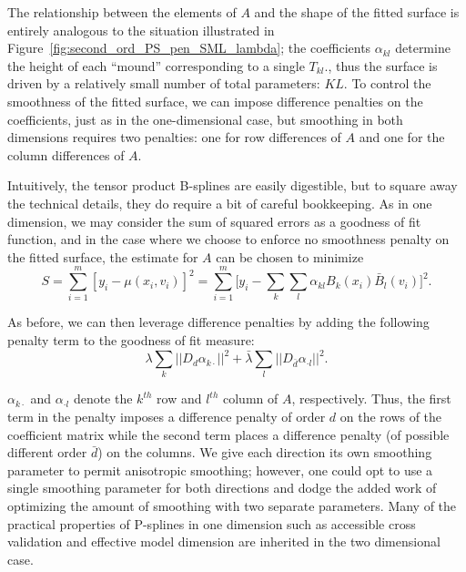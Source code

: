 \documentclass[12pt]{article}
\theoremstyle{definition}
\begin{document}
The relationship between the elements of $A$ and the shape of the fitted surface is entirely analogous to the situation illustrated in Figure~\ref{fig:second_ord_PS_pen_SML_lambda}; the coefficients $\alpha_{kl}$ determine the height of each ``mound'' corresponding to a single $T_{kl}$., thus the surface is driven by a relatively small number of total parameters: $KL$. To control the smoothness of the fitted surface, we can impose difference penalties on the coefficients, just as in the one-dimensional case, but smoothing in both dimensions requires two penalties: one for row differences of $A$ and one for the column differences of $A$.

Intuitively, the tensor product B-splines are easily digestible, but to square away the technical details, they do require a bit of careful bookkeeping. As in one dimension, we may consider the sum of squared errors as a goodness of fit function, and in the case where we choose to enforce no smoothness penalty on the fitted surface, the estimate for $A$ can be chosen to minimize 
\begin{equation} \label{eq:S_2D_intecept_only_model}
S = \sum_{i=1}^m \left[ y_i  - \mu\left(x_i,v_i\right) \right]^2 = \sum_{i=1}^m \bigg[ y_i  - \sum_{k}\sum_{l} \alpha_{kl}B_k\left(x_i\right)\bar{B}_l\left(v_i\right) \bigg]^2.
\end{equation}

As before, we can then leverage difference penalties by adding the following penalty term to the goodness of fit measure:
\begin{equation} \label{eq:unvectorized_2D_penalty}
\lambda \sum_{k} \vert \vert D_d \alpha_{k \cdot} \vert \vert^2 + \bar{\lambda} \sum_{l} \vert \vert D_{\bar{d}} \alpha_{\cdot l} \vert \vert^2 .
\end{equation}

$\alpha_{k \cdot}$ and $\alpha_{\cdot l}$ denote the $k^{th}$ row and $l^{th}$ column of $A$, respectively. Thus, the first term in the penalty imposes a difference penalty of order $d$ on the rows of the coefficient matrix while the second term places a difference penalty (of possible different order $\bar{d}$) on the columns. We give each direction its own smoothing parameter to permit anisotropic smoothing; however, one could opt to use a single smoothing parameter for both directions and dodge the added work of optimizing the amount of smoothing with two separate parameters. Many of the practical properties of P-splines in one dimension such as accessible cross validation and effective model dimension are inherited in the two dimensional case. 
\end{document}
